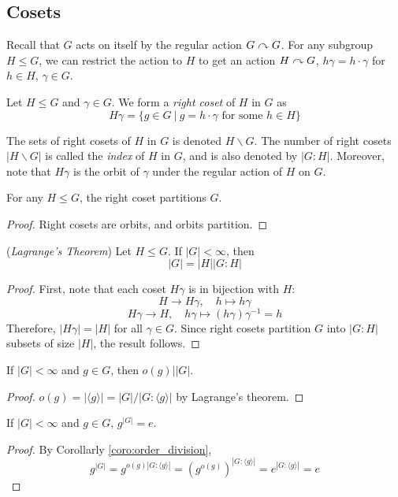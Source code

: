 \documentclass[10pt, a4paper, twoside]{report}
\begin{document}
\subsection{Cosets}
Recall that \(G\) acts on itself by the regular action \(G\curvearrowright G\). For any subgroup \(H\leq G\), we can restrict the action to \(H\) to get an action \(H\curvearrowright G\), \(h\gamma=h\cdot\gamma\) for \(h\in H\), \(\gamma\in G\).
\begin{definition}
    Let \(H\leq G\) and \(\gamma\in G\). We form a \emph{right coset} of \(H\) in \(G\) as 
    \[H\gamma=\{g\in G\:|\:g=h\cdot\gamma\text{  for some }h\in H\}\]
\end{definition}
The sets of right cosets of \(H\) in \(G\) is denoted \(H\backslash G\). The number of right cosets \(|H\backslash G|\) is called the \emph{index} of \(H\) in \(G\), and is also denoted by \(|G:H|\). Moreover, note that \(H\gamma\) is the orbit of \(\gamma\) under the regular action of \(H\) on \(G\). 
\begin{lemma}
    For any \(H\leq G\), the right coset partitions \(G\).
\end{lemma}
\begin{proof}
    Right cosets are orbits, and orbits partition.
\end{proof}
\begin{theorem}
    (\emph{Lagrange's Theorem}) Let \(H\leq G\). If \(|G|<\infty\), then 
    \[|G|=|H||G:H|\]
    \label{thm:lagrange_group}
\end{theorem}
\begin{proof}
    First, note that each coset \(H\gamma\) is in bijection with \(H\):
    \[H\to H\gamma,\quad h\mapsto h\gamma\]
    \[H\gamma\to H,\quad h\gamma\mapsto (h\gamma)\gamma^{-1}=h\]
    Therefore, \(|H\gamma|=|H|\) for all \(\gamma\in G\). Since right cosets partition \(G\) into \(|G:H|\) subsets of size \(|H|\), the result follows.
\end{proof}
\begin{corollary}
    If \(|G|<\infty\) and \(g\in G\), then \(o(g)\big||G|\). 
    \label{coro:order_division}
\end{corollary}
\begin{proof}
    \(o(g)=|\langle g\rangle|=|G|/|G:\langle g\rangle|\) by Lagrange's theorem.
\end{proof}
\begin{corollary}
    If \(|G|<\infty\) and \(g\in G\), \(g^{|G|}=e\).
    \label{coro:group_power_e}
\end{corollary}
\begin{proof}
    By Corollarly \ref{coro:order_division},
    \[g^{|G|}=g^{o(g)|G:\langle g\rangle|}=(g^{o(g)})^{|G:\langle g\rangle|}=e^{|G:\langle g\rangle|}=e\]
\end{proof}
\end{document}
